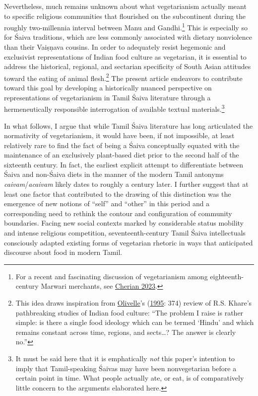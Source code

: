 Nevertheless, much remains unknown about what vegetarianism actually meant to specific religious communities that flourished on the subcontinent during the roughly two-millennia interval between Manu and Gandhi.\footnote{%
For a recent and fascinating discussion of vegetarianism among eighteenth-century Marwari merchants, see \hyperref[Cherian2023]{Cherian 2023}.
}
 This is especially so for Śaiva traditions, which are less commonly associated with dietary nonviolence than their Vaiṣṇava cousins. In order to adequately resist hegemonic and exclusivist representations of Indian food culture as vegetarian, it is essential to address the historical, regional, and sectarian specificity of South Asian attitudes toward the eating of animal flesh.\footnote{%
This idea draws inspiration from \hyperref[Olivelle]{Olivelle}’s (\hyperref[Olivelle1995]{1995}: 374) review of R.\thinskip{}S. Khare’s pathbreaking studies of Indian food culture: “The problem I raise is rather simple: is there a single food ideology which can be termed ‘Hindu’ and which remains constant across time, regions, and sects…? The answer is clearly no.”
}
 The present article endeavors to contribute toward this goal by developing a historically nuanced perspective on representations of vegetarianism in Tamil Śaiva literature through a hermeneutically responsible interrogation of available textual materials.\footnote{%
It must be said here that it is emphatically \emph{not} this paper’s intention to imply that Tamil-speaking Śaivas may have been nonvegetarian before a certain point in time. What people actually ate, or eat, is of comparatively little concern to the arguments elaborated here. 
}



In what follows, I argue that while Tamil Śaiva literature has long articulated the normativity of vegetarianism, it would have been, if not impossible, at least relatively rare to find the fact of being a Śaiva conceptually equated with the maintenance of an exclusively plant-based diet prior to the second half of the sixteenth century. In fact, the earliest explicit attempt to differentiate between Śaiva and non-Śaiva diets in the manner of the modern Tamil antonyms \emph{caivam}/\emph{acaivam} likely dates to roughly a century later. I further suggest that at least one factor that contributed to the drawing of this distinction was the emergence of new notions of “self” and “other” in this period and a corresponding need to rethink the contour and configuration of community boundaries. Facing new social contexts marked by considerable status mobility and intense religious competition, seventeenth-century Tamil Śaiva intellectuals consciously adapted existing forms of vegetarian rhetoric in ways that anticipated discourse about food in modern Tamil. 


